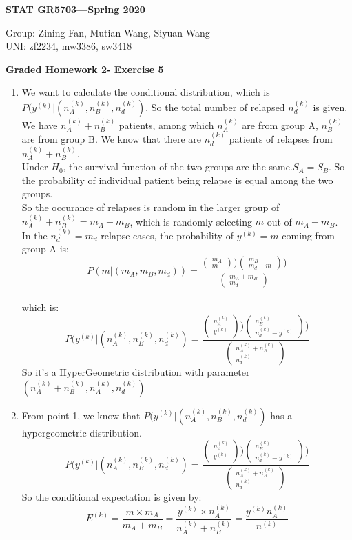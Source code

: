 \documentclass[11pt]{article}
\begin{document}
\begin{flushright}
{\bf STAT GR5703---Spring 2020}
\end{flushright}
\begin{flushleft}
Group: Zining Fan, Mutian Wang, Siyuan Wang\\
UNI: zf2234, mw3386, sw3418\\
\end{flushleft}

\bigskip
\centerline{\bf Graded Homework 2- Exercise 5}

\bigskip 
\begin{enumerate}
\item
We want to calculate the conditional distribution, which is $P(y^{(k)}|(n_A^{(k)},n_B^{(k)},n_d^{(k)})$. So the total number of relapsed $n_d^{(k)}$ is given.\\
We have $n_A^{(k)}+n_B^{(k)}$ patients, among which $n_A^{(k)}$ are from group A, $n_B^{(k)}$ are from group B. We know that there are $n_d^{(k)}$ patients of relapses from $n_A^{(k)}+n_B^{(k)}$.\\
Under $H_0$, the survival function of the two groups are the same.$S_A = S_B$. So the probability of individual patient being relapse is equal among the two groups.\\
So the occurance of relapses is random in the larger group of $n_A^{(k)}+n_B^{(k)} = m_A + m_B$, which is randomly selecting $m$ out of $m_A + m_B$.\\
In the $n_d^{(k)} = m_d$ relapse cases, the probability of $y^{(k)} = m$ coming from group A is:\\
$$P(m|(m_A,m_B,m_d))= \frac{(\mathop{}_{m}^{m_A}))(\mathop{}_{m_d - m}^{m_B}))}{(\mathop{}_{m_d}^{m_A + m_B})}$$\\
which is:
$$P(y^{(k)}|(n_A^{(k)},n_B^{(k)},n_d^{(k)})= \frac{(\mathop{}_{y^{(k)}}^{n_A^{(k)}}))(\mathop{}_{n_d^{(k)}-y^{(k)}}^{n_B^{(k)}}))}{(\mathop{}_{n_d^{(k)}}^{n_A^{(k)}+n_B^{(k)}})}$$
So it's a HyperGeometric distribution with parameter$(n_A^{(k)}+n_B^{(k)},n_A^{(k)},n_d^{(k)})$
\item
From point 1, we know that $P(y^{(k)}|(n_A^{(k)},n_B^{(k)},n_d^{(k)})$ has a hypergeometric distribution.\\
$$P(y^{(k)}|(n_A^{(k)},n_B^{(k)},n_d^{(k)})= \frac{(\mathop{}_{y^{(k)}}^{n_A^{(k)}}))(\mathop{}_{n_d^{(k)}-y^{(k)}}^{n_B^{(k)}}))}{(\mathop{}_{n_d^{(k)}}^{n_A^{(k)}+n_B^{(k)}})}$$
So the conditional expectation is given by:\\
$$E^{(k)} = \frac{m\times m_A}{m_A+m_B} = \frac{y^{(k)}\times n_A^{(k)}}{n_A^{(k)}+n_B^{(k)}} = \frac{y^{(k)} n_A^{(k)}}{n^{(k)}}$$\\

\end{enumerate}
\end{document}
